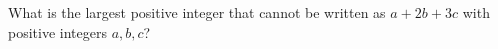 What is the largest positive integer that cannot be written as $a+2b+3c$ with positive integers $a,b,c$?
